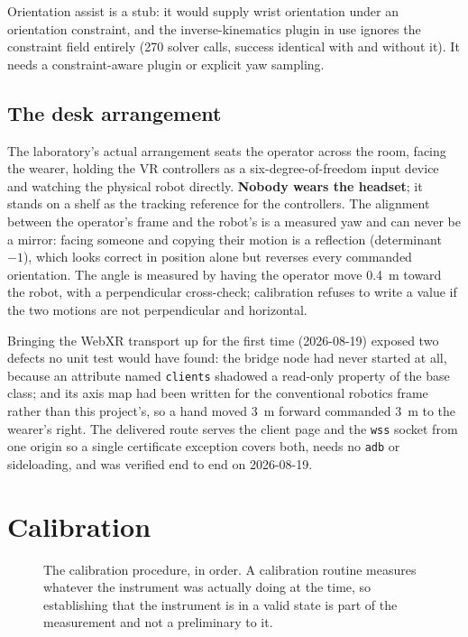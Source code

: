 Orientation assist is a stub: it would supply wrist orientation under an
orientation constraint, and the inverse-kinematics plugin in use ignores the
constraint field entirely (270 solver calls, success identical with and
without it). It needs a constraint-aware plugin or explicit yaw sampling.

\subsection{The desk arrangement}
\label{sec:desk}

The laboratory's actual arrangement seats the operator across the room,
facing the wearer, holding the VR controllers as a six-degree-of-freedom
input device and watching the physical robot directly. \textbf{Nobody wears
the headset}; it stands on a shelf as the tracking reference for the
controllers. The alignment between the operator's frame and the robot's is a
measured yaw and can never be a mirror: facing someone and copying their
motion is a reflection (determinant $-1$), which looks correct in position
alone but reverses every commanded orientation. The angle is measured by
having the operator move \SI{0.4}{\metre} toward the robot, with a
perpendicular cross-check; calibration refuses to write a value if the two
motions are not perpendicular and horizontal.

Bringing the WebXR transport up for the first time (2026-08-19) exposed two
defects no unit test would have found: the bridge node had never started at
all, because an attribute named \texttt{clients} shadowed a read-only
property of the base class; and its axis map had been written for the
conventional robotics frame rather than this project's, so a hand moved
\SI{3}{\metre} forward commanded \SI{3}{\metre} to the wearer's right. The
delivered route serves the client page and the \texttt{wss} socket from one
origin so a single certificate exception covers both, needs no \texttt{adb}
or sideloading, and was verified end to end on 2026-08-19.

\section{Calibration}

\begin{figure}[htbp]
  \centering
  
  \caption[Calibration procedure]{The calibration procedure, in order. A
  calibration routine measures whatever the instrument was actually doing at
  the time, so establishing that the instrument is in a valid state is part
  of the measurement and not a preliminary to it.}
  \label{fig:calibration}
\end{figure}

